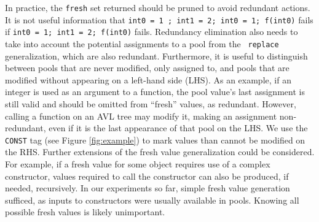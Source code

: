 In practice, the {\tt fresh} set returned should be pruned to avoid
redundant actions.  It is not useful information that {\tt int0 = 1 ; int1 = 2; int0 = 1; f(int0)} fails if {\tt int0 = 1;
  int1 = 2; f(int0)} fails.  Redundancy elimination also needs to take
into account the potential assignments to a pool from the {\tt
  replace} generalization, which are also redundant.  Furthermore, it
is useful to distinguish between pools that are never modified, only
assigned to, and pools that are modified without appearing on a
left-hand side (LHS).  As an example, if an integer is used as an argument
to a function, the pool value's last assignment is still valid and
should be omitted from ``fresh'' values, as redundant.  However,
calling a function on an AVL tree may modify it, making an assignment
non-redundant, even if it is the last appearance of that pool on the
LHS.
We use the {\tt CONST} tag (see Figure \ref{fig:example}) to mark
values than cannot be modified on the RHS.  Further extensions of the
fresh value generalization could be considered.  For example, if a
fresh value for some object requires use of a complex constructor,
values required to call the constructor can also be produced, if
needed, recursively.  In our experiments so
far, simple fresh value generation sufficed, as inputs to
constructors were usually available in pools.  Knowing all possible
fresh values is likely unimportant.


